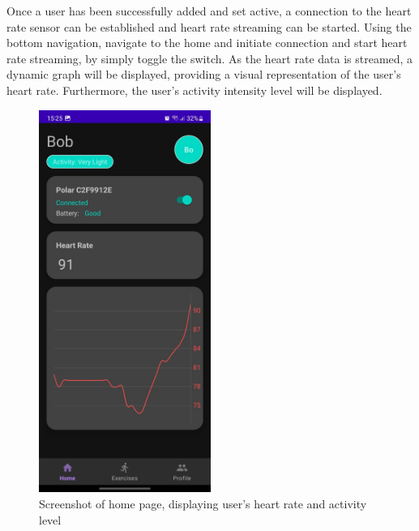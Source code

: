Once a user has been successfully added and set active, a connection to the heart rate sensor can be established and heart rate streaming can be started.
Using the bottom navigation, navigate to the home and initiate connection and start heart rate streaming, by simply toggle the switch. 
As the heart rate data is streamed, a dynamic graph will be displayed, providing a visual representation of the user's heart rate.
Furthermore, the user's activity intensity level will be displayed.
\begin{figure}[H]
    \centering
    \includegraphics[width=0.5\textwidth]{images/home-sc.jpeg}
    \caption{Screenshot of home page, displaying user's heart rate and activity level}
    \label{fig:home_screenshot}
\end{figure}

